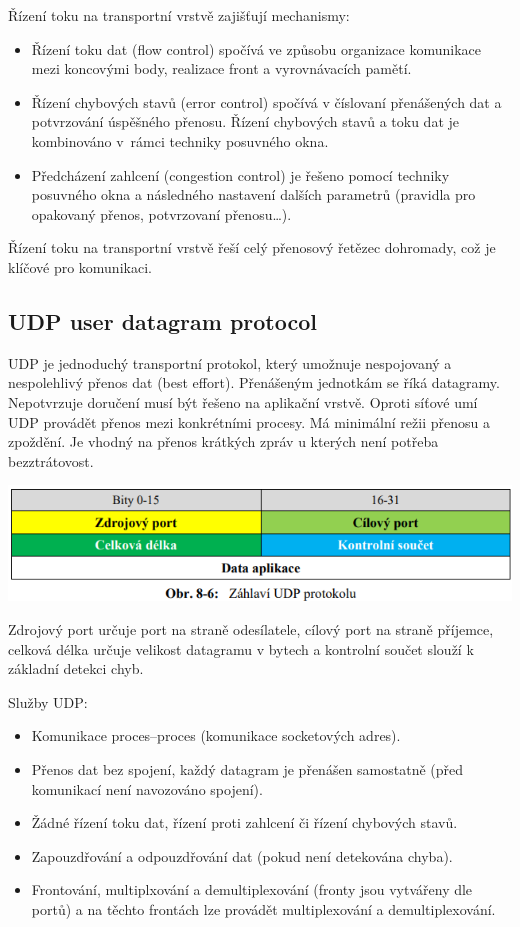 Řízení toku na transportní vrstvě zajišťují mechanismy:
\begin{itemize}[noitemsep]
    \item Řízení toku dat (flow control) spočívá ve způsobu organizace komunikace mezi koncovými body, realizace front a vyrovnávacích pamětí.
    \item Řízení chybových stavů (error control) spočívá v číslovaní  přenášených dat a potvrzování úspěšného přenosu. Řízení chybových stavů a toku dat je kombinováno v~rámci techniky posuvného okna.
    \item Předcházení zahlcení (congestion control) je řešeno pomocí techniky posuvného okna a následného nastavení dalších parametrů (pravidla pro opakovaný přenos, potvrzovaní přenosu\dots).
\end{itemize}

Řízení toku  na transportní vrstvě řeší celý přenosový řetězec dohromady, což je klíčové pro komunikaci.


\subsection{UDP user datagram protocol}

UDP je jednoduchý transportní protokol, který umožnuje nespojovaný a nespolehlivý přenos dat (best effort). Přenášeným jednotkám se říká datagramy. Nepotvrzuje doručení musí být řešeno na aplikační vrstvě. Oproti síťové umí UDP provádět přenos mezi konkrétními procesy. Má minimální režii přenosu a zpoždění. Je vhodný na přenos krátkých zpráv u kterých není potřeba bezztrátovost. 

\begin{center}
\includegraphics[scale = 0.5]{images/-050.png}
\end{center}

Zdrojový port určuje port na straně odesílatele, cílový port na straně příjemce, celková délka určuje velikost datagramu v bytech a kontrolní součet slouží k základní detekci chyb.

Služby UDP:
\begin{itemize}[noitemsep]
    \item Komunikace proces--proces (komunikace socketových adres).
    \item Přenos dat bez spojení, každý datagram je přenášen samostatně (před komunikací není navozováno spojení).
    \item Žádné řízení toku dat, řízení proti zahlcení či řízení chybových stavů.
    \item Zapouzdřování a odpouzdřování dat (pokud není detekována chyba).
    \item Frontování, multiplxování a demultiplexování (fronty jsou vytvářeny dle portů) a na těchto frontách lze provádět multiplexování a demultiplexování.
\end{itemize}

